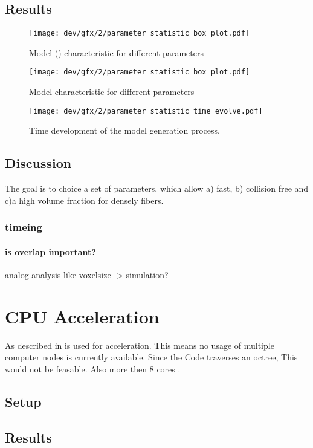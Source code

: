 \subsection{Results}
% 
\begin{figure}[!t]
\centering
\texttt{[image: dev/gfx/2/parameter\_statistic\_box\_plot.pdf]}
\caption{Model (\fiberRadius) characteristic for different parameters}
\end{figure}
% 
\begin{figure}[!t]
\centering
\texttt{[image: dev/gfx/2/parameter\_statistic\_box\_plot.pdf]}
\caption{Model characteristic for different parameters}
\end{figure}
% 
\begin{figure}[!t]
\centering
\texttt{[image: dev/gfx/2/parameter\_statistic\_time\_evolve.pdf]}
\caption[Time development of the model generation process.]{Time development of the model generation process.}
\end{figure}
% 
\subsection{Discussion}
% 
The goal is to choice a set of parameters, which allow a) fast, b) collision free and c)a high volume fraction for densely fibers. 
%  
\subsubsection{timeing}
% 
\paragraph{is overlap important?}
% 
analog analysis like voxelsize -> simulation?
% 
\section{CPU Acceleration}
% 
As described in \dummy \openmp is used for acceleration.
This means no usage of multiple computer nodes is currently available.
Since the Code traverses an octree, This would not be feasable.
Also more then 8 cores \dummy.
% 
\subsection{Setup}
% 
\subsection{Results}
% 
